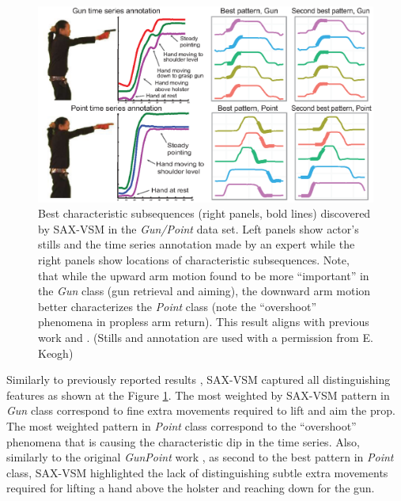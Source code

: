 \begin{figure}[t]
   \centering
   \includegraphics[width=130mm]{figures/gun-point.eps}
   \caption{Best characteristic subsequences (right panels, bold lines) discovered by SAX-VSM in
   the \textit{Gun/Point} data set. 
   Left panels show actor's stills and the time series annotation made by an expert while the right panels 
   show locations of characteristic subsequences.
   Note, that while the upward arm motion found to be more ``important'' in the \textit{Gun} class 
   (gun retrieval and aiming), the downward arm motion better characterizes the \textit{Point} class 
   (note the ``overshoot'' phenomena in propless arm return). 
   This result aligns with previous work \cite{citeulike:7344347} and \cite{citeulike:11345338}.
   (Stills and annotation are used with a permission from E. Keogh) }
   \label{fig:shapelet-like-patterns}
\end{figure}

Similarly to previously reported results \cite{citeulike:7344347} \cite{citeulike:11345338}, 
SAX-VSM captured all distinguishing features as shown at the Figure \ref{fig:shapelet-like-patterns}. 
The most weighted by SAX-VSM pattern in \textit{Gun} class correspond to fine extra movements required to 
lift and aim the prop. 
The most weighted pattern in \textit{Point} class correspond to the ``overshoot'' phenomena that is causing the 
characteristic dip in the time series. 
Also, similarly to the original \textit{GunPoint} work \cite{Ratanamahatana04makingtime-series}, as second to the best 
pattern in \textit{Point} class, SAX-VSM highlighted the lack of distinguishing subtle extra movements required
for lifting a hand above the holster and reaching down for the gun.

